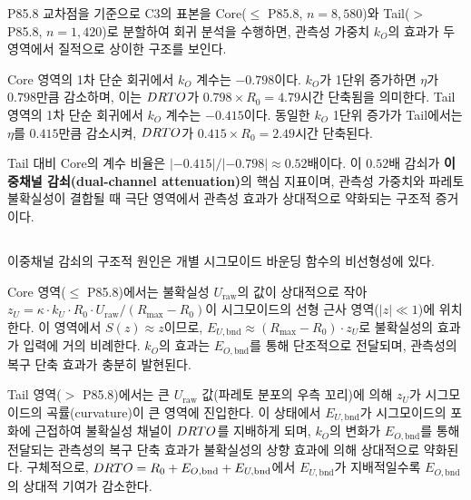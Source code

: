 P85.8 교차점을 기준으로 C3의 표본을 Core($\leq$ P85.8, $n = 8{,}580$)와
Tail($>$ P85.8, $n = 1{,}420$)로 분할하여 회귀 분석을 수행하면,
관측성 가중치 $k_O$의 효과가 두 영역에서 질적으로 상이한 구조를 보인다.

Core 영역의 1차 단순 회귀에서 $k_O$ 계수는 $-0.798$이다.
$k_O$가 1단위 증가하면 $\eta$가 $0.798$만큼 감소하며,
이는 $DRTO$가 $0.798 \times R_0 = 4.79$시간 단축됨을 의미한다.
Tail 영역의 1차 단순 회귀에서 $k_O$ 계수는 $-0.415$이다.
동일한 $k_O$ 1단위 증가가 Tail에서는 $\eta$를 $0.415$만큼 감소시켜,
$DRTO$가 $0.415 \times R_0 = 2.49$시간 단축된다.

Tail 대비 Core의 계수 비율은 $|-0.415|/|-0.798| \approx 0.52$배이다.
이 $0.52$배 감쇠가 \textbf{이중채널 감쇠(dual-channel attenuation)}의
핵심 지표이며, 관측성 가중치와 파레토 불확실성이 결합될 때
극단 영역에서 관측성 효과가 상대적으로 약화되는 구조적 증거이다.


\subsection{}
\label{subsec:ch5_mechanism}

이중채널 감쇠의 구조적 원인은 개별 시그모이드 바운딩 함수의 비선형성에 있다.

Core 영역($\leq$ P85.8)에서는 불확실성 $U_{\text{raw}}$의 값이 상대적으로 작아
$z_U = \kappa \cdot k_U \cdot R_0 \cdot U_{\text{raw}} / (R_{\max} - R_0)$이 시그모이드의 선형 근사 영역($|z| \ll 1$)에
위치한다. 이 영역에서 $S(z) \approx z$이므로,
$E_{U,\text{bnd}} \approx (R_{\max} - R_0) \cdot z_U$로 불확실성의 효과가
입력에 거의 비례한다. $k_O$의 효과는 $E_{O,\text{bnd}}$를 통해
단조적으로 전달되며, 관측성의 복구 단축 효과가 충분히 발현된다.

Tail 영역($>$ P85.8)에서는 큰 $U_{\text{raw}}$ 값(파레토 분포의 우측 꼬리)에 의해
$z_U$가 시그모이드의 곡률(curvature)이 큰 영역에 진입한다.
이 상태에서 $E_{U,\text{bnd}}$가 시그모이드의 포화에 근접하여
불확실성 채널이 $DRTO$를 지배하게 되며,
$k_O$의 변화가 $E_{O,\text{bnd}}$를 통해 전달되는 관측성의
복구 단축 효과가 불확실성의 상향 효과에 의해 상대적으로 약화된다.
구체적으로, $DRTO = R_0 + E_{O,\text{bnd}} + E_{U,\text{bnd}}$에서
$E_{U,\text{bnd}}$가 지배적일수록 $E_{O,\text{bnd}}$의 상대적 기여가 감소한다.

